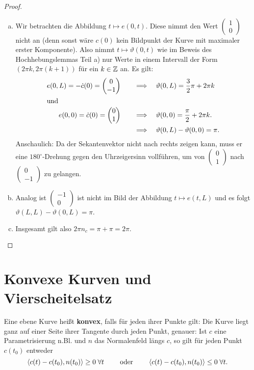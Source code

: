 \documentclass[11pt]{scrbook}
\newcommand{\tta}{\vartheta}
\begin{document}
\begin{st}[Umlaufsatz]
\begin{proof}
\begin{enumerate}[a)]
	\item
		Wir betrachten die Abbildung $t \mapsto e(0, t)$. Diese nimmt den Wert $\begin{pmatrix} 1 \\ 0 \end{pmatrix}$ nicht an (denn sonst wäre $c(0)$ kein Bildpunkt der Kurve mit maximaler erster Komponente). Also nimmt $t \mapsto \tta(0, t)$ wie im Beweis des Hochhebungslemmas Teil a) nur Werte in einem Intervall der Form $(2 \pi k, 2 \pi (k+1))$ für ein $k \in \mathbb{Z}$ an. Es gilt:
\begin{align*}
 e(0, L) = - \dot c(0) = \begin{pmatrix} 0 \\ -1 \end{pmatrix} \qquad &\Longrightarrow \quad \tta(0, L) = \f{3}{2} \pi + 2 \pi k \\
\intertext{und} e(0, 0) = \dot c(0) = \begin{pmatrix} 0 \\ 1 \end{pmatrix} \qquad &\Longrightarrow \quad \tta(0, 0) = \f{\pi}{2} + 2 \pi k. \\
& \Longrightarrow \quad \tta(0, L) - \tta(0, 0) = \pi.
\end{align*}
Anschaulich: Da der Sekantenvektor nicht nach rechts zeigen kann, muss er eine $180^{\circ}$-Drehung gegen den Uhrzeigersinn vollführen, um von $\begin{pmatrix} 0 \\ 1 \end{pmatrix}$ nach $\begin{pmatrix} 0 \\ -1 \end{pmatrix}$ zu gelangen.

	\item
		Analog ist  $\begin{pmatrix} -1 \\ 0 \end{pmatrix}$ ist nicht im Bild der Abbildung $t \mapsto e(t, L)$ und es folgt $\tta(L, L) - \tta(0, L) = \pi$.

	\item
		Insgesamt gilt also $2 \pi n_c = \pi + \pi = 2 \pi$.
\end{enumerate}
\end{proof}
\end{st}

\section{Konvexe Kurven und Vierscheitelsatz}
\begin{df}
Eine ebene Kurve heißt \textbf{konvex}, falls für jeden ihrer Punkte gilt: Die Kurve liegt ganz auf einer Seite ihrer Tangente durch jeden Punkt, genauer: Ist $c$ eine Parametrisierung n.Bl. und $n$ das Normalenfeld längs $c$, so gilt für jeden Punkt $c(t_0)$ entweder
\[ \langle c(t) - c(t_0), n(t_0) \rangle \geq 0 \; \forall t \qquad \text{ oder } \qquad \langle c(t) - c(t_0), n(t_0) \rangle \leq 0 \; \forall t. \]
\end{df}
\end{document}
